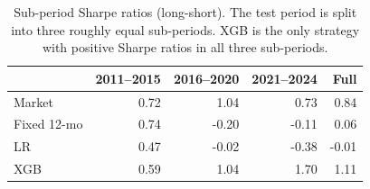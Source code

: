 \begin{table}[H]
\centering
\small
\begin{tabular}{l r r r r}
\toprule
 & 2011--2015 & 2016--2020 & 2021--2024 & Full \\
\midrule
Market         & 0.72 & 1.04 & 0.73 & 0.84 \\
Fixed 12-mo    & 0.74 & -0.20 & -0.11 & 0.06 \\
LR         & 0.47 & -0.02 & -0.38 & -0.01 \\
XGB        & 0.59 & 1.04 & 1.70 & 1.11 \\
\bottomrule
\end{tabular}
\caption{Sub-period Sharpe ratios (long-short). The test period is split into three roughly equal sub-periods. XGB is the only strategy with positive Sharpe ratios in all three sub-periods.}
\label{tab:subperiod}
\end{table}